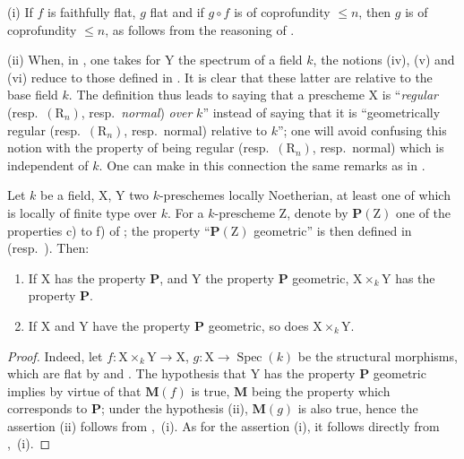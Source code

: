 \begin{remarks}[6.8.4]
\label{IV.6.8.4}
(i) If $f$ is faithfully flat, $g$ flat and if $g\circ f$ is of coprofundity $\leqslant n$, then $g$ is of coprofundity $\leqslant n$, as follows from the reasoning of .

(ii) When, in , one takes for $\mathrm{Y}$ the spectrum of a field $k$, the notions (iv), (v) and (vi) reduce to those defined in . It is clear that these latter are relative to the base field $k$. The definition  thus leads to saying that a prescheme $\mathrm{X}$ is ``\emph{regular} (resp.\ $(\mathrm{R}_n)$, resp.\ \emph{normal}) \emph{over} $k$'' instead of saying that it is ``geometrically regular (resp.\ $(\mathrm{R}_n)$, resp.\ normal) relative to $k$''; one will avoid confusing this notion with the property of being regular (resp.\ $(\mathrm{R}_n)$, resp.\ normal) which is independent of $k$. One can make in this connection the same remarks as in .
\end{remarks}

\begin{proposition}[6.8.5]
\label{IV.6.8.5}
Let $k$ be a field, $\mathrm{X}$, $\mathrm{Y}$ two $k$-preschemes locally Noetherian, at least one of which is locally of finite type over $k$. For a $k$-prescheme $\mathrm{Z}$, denote by $\boldsymbol{P}(\mathrm{Z})$ one of the properties \textup{c)} to \textup{f)} of ; the property ``$\boldsymbol{P}(\mathrm{Z})$ geometric'' is then defined in  (resp.\ ). Then:
\begin{enumerate}[label=\textup{(\roman*)}]
  \item If $\mathrm{X}$ has the property $\boldsymbol{P}$, and $\mathrm{Y}$ the property $\boldsymbol{P}$ geometric, $\mathrm{X}\times_k\mathrm{Y}$ has the property $\boldsymbol{P}$.
  \item If $\mathrm{X}$ and $\mathrm{Y}$ have the property $\boldsymbol{P}$ geometric, so does $\mathrm{X}\times_k\mathrm{Y}$.
\end{enumerate}
\end{proposition}

\begin{proof}
Indeed, let $f:\mathrm{X}\times_k\mathrm{Y}\to\mathrm{X}$, $g:\mathrm{X}\to\operatorname{Spec}(k)$ be the structural morphisms, which are flat by  and . The hypothesis that $\mathrm{Y}$ has the property $\boldsymbol{P}$ geometric implies by virtue of  that $\boldsymbol{M}(f)$ is true, $\boldsymbol{M}$ being the property  which corresponds to $\boldsymbol{P}$; under the hypothesis (ii), $\boldsymbol{M}(g)$ is also true, hence the assertion (ii) follows from ,~(i). As for the assertion (i), it follows directly from ,~(i).
\end{proof}

